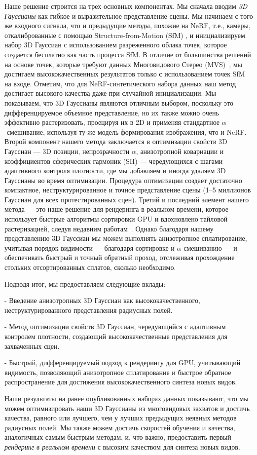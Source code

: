 Наше решение строится на трех основных компонентах. Мы сначала вводим \emph{3D Гауссианы} как гибкое и выразительное представление сцены.
Мы начинаем с того же входного сигнала, что и предыдущие методы, похожие на NeRF, т.е., камеры, откалиброванные с помощью Structure-from-Motion (SfM) \cite{snavely2006photo}, и инициализируем набор 3D Гауссиан с использованием разреженного облака точек, которое создается бесплатно как часть процесса SfM. В отличие от большинства решений на основе точек, которые требуют данных Многовидового Стерео (MVS)~\cite{aliev20,kopanas21,ruckert22}, мы достигаем высококачественных результатов только с использованием точек SfM на входе. Отметим, что для NeRF-синтетического набора данных наш метод достигает высокого качества даже при случайной инициализации.
Мы показываем, что 3D Гауссианы являются отличным выбором, поскольку это дифференцируемое объемное представление, но их также можно очень эффективно растеризовать, проецируя их в 2D и применяя стандартное $\alpha$-смешивание, используя ту же модель формирования изображения, что и NeRF.
Второй компонент нашего метода заключается в оптимизации свойств 3D Гауссиан — 3D позиции, непрозрачности $\alpha$, анизотропной ковариации и коэффициентов сферических гармоник (SH) — чередующихся с шагами адаптивного контроля плотности, где мы добавляем и иногда удаляем 3D Гауссианы во время оптимизации. Процедура оптимизации создает достаточно компактное, неструктурированное и точное представление сцены (1–5 миллионов Гауссиан для всех протестированных сцен).
Третий и последний элемент нашего метода — это наше решение для рендеринга в реальном времени, которое использует быстрые алгоритмы сортировки GPU и вдохновлено тайловой растеризацией, следуя недавним работам~\cite{Lassner_2021_CVPR}. Однако благодаря нашему представлению 3D Гауссиан мы можем выполнять анизотропное сплатирование, учитывая порядок видимости — благодаря сортировке и $\alpha$-смешиванию — и обеспечивать быстрый и точный обратный проход, отслеживая прохождение стольких отсортированных сплатов, сколько необходимо.



\noindent
Подводя итог, мы предоставляем следующие вклады:

    
- Введение анизотропных 3D Гауссиан как высококачественного, неструктурированного представления радиусных полей.
    
- Метод оптимизации свойств 3D Гауссиан, чередующийся с адаптивным контролем плотности, создающий высококачественные представления для захваченных сцен.
    
- Быстрый, дифференцируемый подход к рендерингу для GPU, учитывающий видимость, позволяющий анизотропное сплатирование и быстрое обратное распространение для достижения высококачественного синтеза новых видов.


\noindent
Наши результаты на ранее опубликованных наборах данных показывают, что мы можем оптимизировать наши 3D Гауссианы из многовидовых захватов и достичь качества, равного или лучшего, чем у лучших предыдущих неявных методов радиусных полей. Мы также можем достичь скоростей обучения и качества, аналогичных самым быстрым методам, и, что важно, предоставить первый \emph{рендеринг в реальном времени} с высоким качеством для синтеза новых видов.